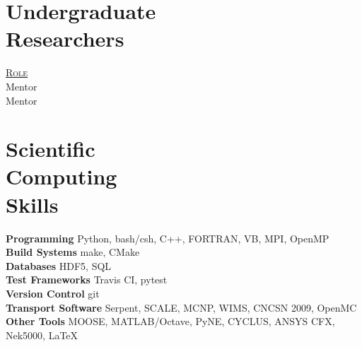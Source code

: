 \documentclass[margin,line]{resume}
\begin{document}
\begin{resume}
    \section{\mysidestyle Undergraduate\\Researchers}
    \hfill\textsc{\underline{Role}}\\
    \hfill Mentor\\
    \hfill Mentor\\
    \section{\mysidestyle Scientific\\Computing\\Skills}
                \textbf{Programming} \hfill Python, bash/csh, C++, FORTRAN, 
                VB, MPI, OpenMP \vspace{.5mm}\\%
                \textbf{Build Systems} \hfill make, CMake\vspace{.5mm}\\%
                \textbf{Databases} \hfill HDF5, SQL\vspace{.5mm}\\%
                \textbf{Test Frameworks} \hfill Travis CI, 
                pytest\vspace{.5mm}\\%
                \textbf{Version Control} \hfill git\vspace{.5mm}\\%
                \textbf{Transport Software} \hfill Serpent, SCALE, MCNP, WIMS, CNCSN 2009,  
                OpenMC\vspace{.5mm}\\%
                \textbf{Other Tools} \hfill  MOOSE, MATLAB/Octave, PyNE, 
                CYCLUS, ANSYS CFX, Nek5000, \LaTeX \vspace{.5mm}%


\end{resume}
\end{document}

